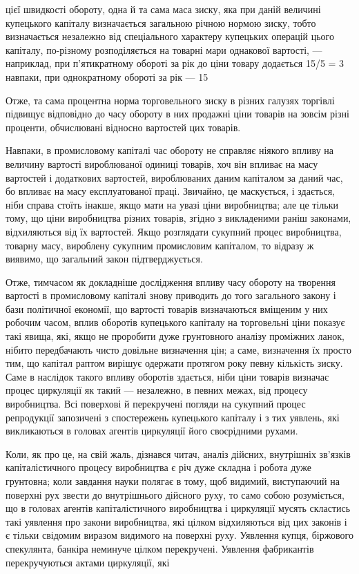 цієї швидкості обороту, одна й та сама маса зиску, яка при даній
величині купецького капіталу визначається загальною річною
нормою зиску, тобто визначається незалежно від спеціального
характеру купецьких операцій цього капіталу, по-різному розподіляється
на товарні мари однакової вартості, — наприклад, при п’ятикратному
обороті за рік до ціни товару додається 15/5 = 3%
навпаки, при однократному обороті за рік — 15%

Отже, та сама процентна норма торговельного зиску в різних
галузях торгівлі підвищує відповідно до часу обороту в них
продажні ціни товарів на зовсім різні проценти, обчислювані
відносно вартостей цих товарів.

Навпаки, в промисловому капіталі час обороту не справляє
ніякого впливу на величину вартості вироблюваної одиниці товарів,
хоч він впливає на масу вартостей і додаткових вартостей,
вироблюваних даним капіталом за даний час, бо впливає на
масу експлуатованої праці. Звичайно, це маскується, і здається,
ніби справа стоїть інакше, якщо мати на увазі ціни виробництва;
але це тільки тому, що ціни виробництва різних товарів, згідно
з викладеними раніш законами, відхиляються від їх вартостей.
Якщо розглядати сукупний процес виробництва, товарну масу,
вироблену сукупним промисловим капіталом, то відразу ж виявимо,
що загальний закон підтверджується.

Отже, тимчасом як докладніше дослідження впливу часу
обороту на творення вартості в промисловому капіталі знову
приводить до того загального закону і бази політичної економії,
що вартості товарів визначаються вміщеним у них робочим
часом, вплив оборотів купецького капіталу на торговельні ціни
показує такі явища, які, якщо не проробити дуже грунтовного аналізу
проміжних ланок, нібито передбачають чисто довільне визначення
цін; а саме, визначення їх просто тим, що капітал раптом
вирішує одержати протягом року певну кількість зиску. Саме
в наслідок такого впливу оборотів здається, ніби ціни товарів
визначає процес циркуляції як такий — незалежно, в певних межах,
від процесу виробництва. Всі поверхові й перекручені
погляди на сукупний процес репродукції запозичені з спостережень
купецького капіталу і з тих уявлень, які викликаються
в головах агентів циркуляції його своєрідними рухами.

Коли, як про це, на свій жаль, дізнався читач, аналіз дійсних,
внутрішніх зв’язків капіталістичного процесу виробництва є
річ дуже складна і робота дуже грунтовна; коли завдання
науки полягає в тому, щоб видимий, виступаючий на поверхні
рух звести до внутрішнього дійсного руху, то само собою
розуміється, що в головах агентів капіталістичного виробництва
і циркуляції мусять скластись такі уявлення про закони виробництва,
які цілком відхиляються від цих законів і є тільки свідомим
виразом видимого на поверхні руху. Уявлення купця,
біржового спекулянта, банкіра неминуче цілком перекручені.
Уявлення фабрикантів перекручуються актами циркуляції, які
